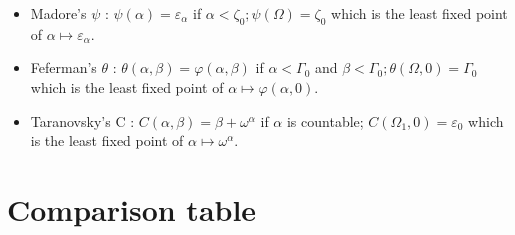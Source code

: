 \documentclass[10pt]{article}
\begin{document}
\smallskip
\begin{itemize}
     \setlength{\itemsep}{1pt}
     \setlength{\parskip}{0pt}
     \setlength{\parsep}{0pt}
\item Madore's \(\psi\) : \(\psi(\alpha) = \varepsilon_\alpha \) if \(\alpha < \zeta_0 ; \psi(\Omega) = \zeta_0 \) which is the least fixed point of \( \alpha \mapsto \varepsilon_\alpha \).

\item Feferman's \(\theta\) : \(\theta(\alpha,\beta) = \varphi(\alpha,\beta) \) if \( \alpha < \Gamma_0 \) and \( \beta < \Gamma_0 ; \theta(\Omega,0) = \Gamma_0 \) which is the least fixed point of \( \alpha \mapsto \varphi(\alpha,0) \).

\item Taranovsky's C : \( C(\alpha,\beta) = \beta+\omega^\alpha \) if \( \alpha \) is countable; \( C(\Omega_1,0) = \varepsilon_0 \) which is the least fixed point of \( \alpha \mapsto \omega^\alpha \).
\end{itemize}

\section{Comparison table}
\end{document}

